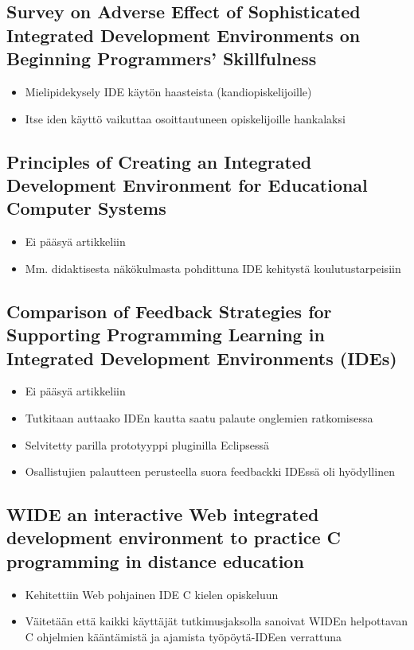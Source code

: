 \documentclass[11pt]{article}
\begin{document}
\subsection{Survey on Adverse Effect of Sophisticated Integrated Development Environments on Beginning Programmers' Skillfulness}
\begin{itemize}
\item Mielipidekysely IDE käytön haasteista (kandiopiskelijoille)
\item Itse iden käyttö vaikuttaa osoittautuneen opiskelijoille hankalaksi
\end{itemize}

\subsection{Principles of Creating an Integrated Development Environment for Educational Computer Systems}
\begin{itemize}
\item Ei pääsyä artikkeliin
\item Mm. didaktisesta näkökulmasta pohdittuna IDE kehitystä
  koulutustarpeisiin
\end{itemize}

\subsection{Comparison of Feedback Strategies for Supporting Programming Learning in Integrated Development Environments (IDEs)}
\begin{itemize}
\item Ei pääsyä artikkeliin
\item Tutkitaan auttaako IDEn kautta saatu palaute onglemien
  ratkomisessa
\item Selvitetty parilla prototyyppi pluginilla Eclipsessä
\item Osallistujien palautteen perusteella suora feedbackki IDEssä oli
  hyödyllinen
\end{itemize}

\subsection{WIDE an interactive Web integrated development environment to practice C programming in distance education}
\begin{itemize}
\item Kehitettiin Web pohjainen IDE C kielen opiskeluun
\item Väitetään että kaikki käyttäjät tutkimusjaksolla sanoivat WIDEn
  helpottavan C ohjelmien kääntämistä ja ajamista työpöytä-IDEen
  verrattuna
\end{itemize}
\end{document}
